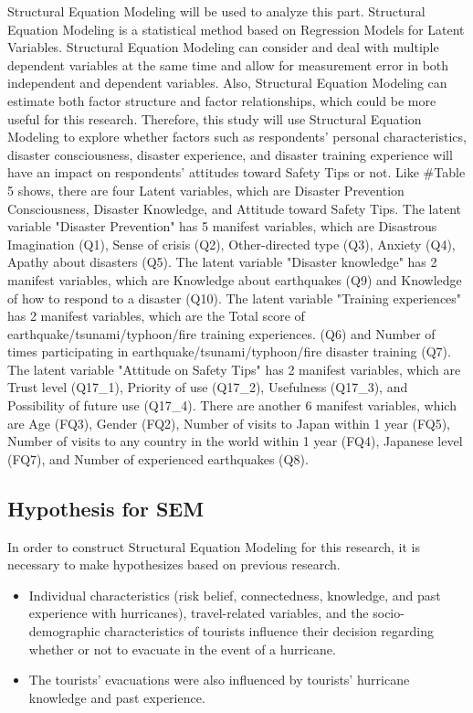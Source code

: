 Structural Equation Modeling will be used to analyze this part. Structural Equation Modeling is a statistical method based on Regression Models for Latent Variables. Structural Equation Modeling can consider and deal with multiple dependent variables at the same time and allow for measurement error in both independent and dependent variables. Also, Structural Equation Modeling can estimate both factor structure and factor relationships, which could be more useful for this research. Therefore, this study will use Structural Equation Modeling to explore whether factors such as respondents' personal characteristics, disaster consciousness, disaster experience, and disaster training experience will have an impact on respondents' attitudes toward Safety Tips or not. Like \#Table 5 shows, there are four Latent variables, which are Disaster Prevention Consciousness, Disaster Knowledge, and Attitude toward Safety Tips. The latent variable "Disaster Prevention" has 5 manifest variables, which are Disastrous Imagination (Q1), Sense of crisis (Q2), Other-directed type (Q3), Anxiety (Q4), Apathy about disasters (Q5). The latent variable "Disaster knowledge" has 2 manifest variables, which are Knowledge about earthquakes (Q9) and Knowledge of how to respond to a disaster (Q10). The latent variable "Training experiences" has 2 manifest variables, which are the Total score of earthquake/tsunami/typhoon/fire training experiences. (Q6) and Number of times participating in earthquake/tsunami/typhoon/fire disaster training (Q7). The latent variable "Attitude on Safety Tips" has 2 manifest variables, which are Trust level (Q17\_1), Priority of use (Q17\_2), Usefulness (Q17\_3), and Possibility of future use (Q17\_4). There are another 6 manifest variables, which are Age (FQ3), Gender (FQ2), Number of visits to Japan within 1 year (FQ5), Number of visits to any country in the world within 1 year (FQ4), Japanese level (FQ7), and Number of experienced earthquakes (Q8).

\subsection{Hypothesis for SEM}

In order to construct Structural Equation Modeling for this research, it is necessary to make hypothesizes based on previous research.  

\begin{itemize}
\item Individual characteristics (risk belief, connectedness, knowledge, and past experience with hurricanes), travel-related variables, and the socio-demographic characteristics of tourists influence their decision regarding whether or not to evacuate in the event of a hurricane.~\cite{Cahyanto2014AnEE}
\item The tourists' evacuations were also influenced by tourists' hurricane knowledge and past experience.~\cite{Cahyanto2016StatedPO}
\end{itemize}

